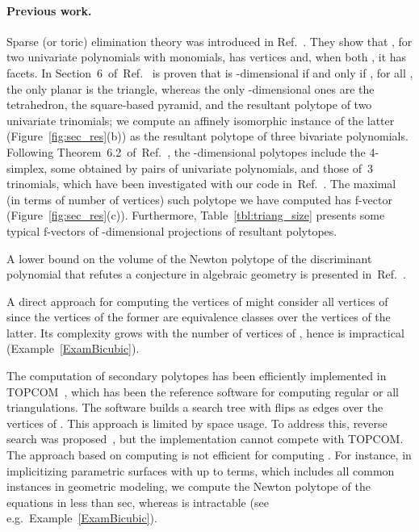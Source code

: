 \documentclass{article}
\newcommand\refcite[1]{\citealp{#1}} \newcommand\citess[1]{\textsuperscript{\textup{\citealp{#1}}}}
\begin{document}
\paragraph{Previous work.}
Sparse (or toric) elimination theory was introduced in Ref.~\refcite{GKZ}.
They show that ,
for two univariate polynomials with 
monomials, has  vertices and, when both ,
it has  facets.
In Section~6~of~Ref.~\refcite{St94} is proven that  is -dimensional
if and only if , for all , the only planar 
is the triangle, whereas the only -dimensional ones are the tetrahedron,
the square-based pyramid, and the resultant polytope of two univariate trinomials;
we compute an affinely isomorphic instance of the latter (Figure~\ref{fig:sec_res}(b))
as the resultant polytope of three bivariate polynomials.
Following Theorem~6.2~of~Ref.~\refcite{St94}, the -dimensional polytopes
include
the 4-simplex, some  obtained by pairs of univariate polynomials,
and those of~3 trinomials, which have been investigated with our
code in~Ref.~\refcite{DEF12}. 
The maximal (in terms of number of vertices) such polytope we have computed has
f-vector  (Figure~\ref{fig:sec_res}(c)). 
Furthermore, Table~\ref{tbl:triang_size} presents some typical f-vectors of
-dimensional projections of resultant polytopes. 

A lower bound on the volume of the Newton polytope of the discriminant polynomial 
that refutes a conjecture in algebraic geometry  
is presented in~Ref.~\refcite{discrim_vol}.

A direct approach for computing the vertices of  might
consider all vertices of  since the vertices of
the former are equivalence classes over the vertices of the latter.
Its complexity grows with the number of vertices
of , hence is impractical (Example~\ref{ExamBicubic}).

The computation of secondary polytopes has been efficiently implemented in
TOPCOM~\citess{RambTOPCOM}, which has been the reference software for computing
regular or all triangulations.  
The software builds a search tree with flips as edges over the vertices of .  
This approach is limited by space usage.  
To address this, reverse search was proposed~\citess{IMTI02}, but the
implementation cannot compete with TOPCOM.
The approach based on computing  is not efficient
for computing .
For instance, in implicitizing parametric surfaces with up to 
terms, which includes all common instances in geometric modeling,
we compute the Newton polytope of the equations in less than sec,
whereas  is intractable (see e.g.\ Example~\ref{ExamBicubic}). 
\end{document}
